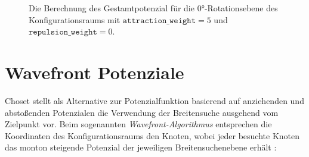 \begin{figure}[h!]
	\centering
	\footnotesize
	\centerline{}
	\caption{Die Berechnung des Gestamtpotenzial für die $0$°-Rotationsebene des Konfigurationsraums mit $\texttt{attraction\_weight}=5$ und $\texttt{repulsion\_weight}=0$.}
\end{figure}



\section{Wavefront Potenziale}

Choset stellt als Alternative zur Potenzialfunktion basierend auf anziehenden und abstoßenden Potenzialen die Verwendung der Breitensuche ausgehend vom Zielpunkt vor. Beim sogenannten \textit{Wavefront-Algorithmus} entsprechen die Koordinaten des Konfigurationsraums den Knoten, wobei jeder besuchte Knoten das monton steigende Potenzial der jeweiligen Breitensuchenebene erhält \cite{choset.2007}:

